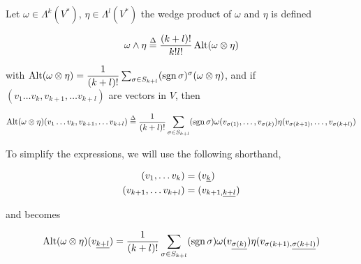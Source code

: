 \documentclass[../main-manifolds.tex]{subfiles}
\begin{document}


\begin{definition}
    Let $\omega\in \Lambda^k(V^*)$, $\eta\in\Lambda^l(V^*)$ the wedge product of $\omega$ and $\eta$ is defined 

\begin{equation}\label{lee-chp14:wedge-product}
    \omega\wedge \eta \overset{\Delta}{=} \dfrac{(k+l)!}{k!l!}\operatorname{Alt}(\omega\otimes \eta) 
\end{equation}

with $\operatorname{Alt}(\omega\otimes\eta) = \dfrac{1}{(k+l)!}\sum_{\sigma\in S_{k+l}}(\operatorname{sgn}\sigma)^\sigma{(\omega\otimes\eta)}$, and if $(v_1\ldots v_k, v_{k+1},\ldots v_{k+l})$ are vectors in $V$, then

\begin{equation}\label{lee-chp14:wedge-product-evaluated}
\operatorname{Alt}(\omega\otimes\eta)(v_1\ldots v_k, v_{k+1},\ldots v_{k+l})\overset{\Delta}{=}\dfrac{1}{(k+l)!}\sum_{\sigma\in S_{k+l}}(\operatorname{sgn}\sigma)\omega(v_{\sigma(1)},\ldots, v_{\sigma(k)})\eta(v_{\sigma(k+1)},\ldots, v_{\sigma(k+l)})
\end{equation}

To simplify the expressions, we will use the following shorthand, 

\begin{align}
    (v_1,\ldots v_k) &= (\Ul{v}[k]) \\
    (v_{k+1},\ldots v_{k+l}) &= (\Ul{v}[k+1][k+l])
\end{align}

and  becomes

\begin{equation}
    \Alt{\omega\otimes\eta}(\Ul{v}[k+l]) = \dfrac{1}{(k+l)!}\sum_{\sigma\in S_{k+l}}(\sgn\sigma)\omega(\Ul{v}[\sigma({k})])\eta(\Ul{v}[\sigma({k+1})][\sigma({k+l})])
\end{equation}

\end{definition}
\end{document}
